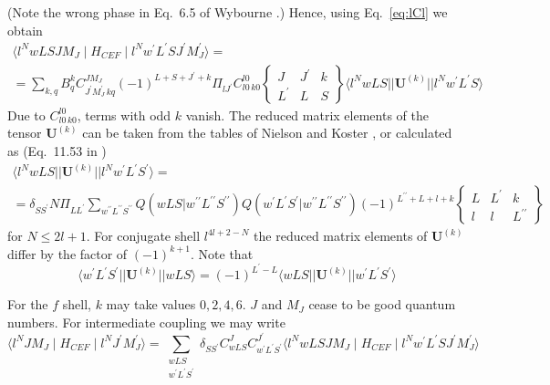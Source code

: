 \documentclass[a4paper,oneside,12pt]{extarticle}
\def \dprime {\prime\prime}
\begin{document}
%
(Note the wrong phase in Eq.~6.5 of Wybourne \cite{Wybourne}.) Hence, using Eq.~\ref{eq:lCl} we obtain
%
\begin{multline}
\langle l^N wLSJM_J \mid H_{CEF} \mid l^N w^{\prime}L^{\prime}SJ^{\prime}M_J^{\prime} \rangle = \\ =
\sum_{k,q} B_q^k C_{J^{\prime} M_J^{\prime} \, k q}^{J M_J}
(-1)^{L + S + J^{\prime}+k} \Pi_{l J^{\prime}}
C_{l 0 \, k 0}^{l 0}
\left \{
\begin{array}{ccc}
J & J^{\prime} & k \\
L^{\prime} & L & S
\end{array}
\right \} 
\langle l^N wLS || \mathbf{U}^{(k)} || l^N w^{\prime}L^{\prime}S \rangle
\end{multline}
%
Due to $C_{l 0 \, k 0}^{l 0}$, terms with odd $k$ vanish. The reduced matrix elements of the tensor $\mathbf{U}^{(k)}$ can be taken from the tables of Nielson and Koster \cite{NielsonKoster}, or calculated as (Eq.~11.53 in \cite{Cowan})
%
\begin{multline}
\langle l^N wLS || \mathbf{U}^{(k)} || l^N w^{\prime}L^{\prime}S^{\prime} \rangle = \\ =
\delta_{SS^{\prime}} N \Pi_{LL^{\prime}} \sum_{w^{\dprime}L^{\dprime}S^{\dprime}} Q(wLS|w^{\dprime}L^{\dprime}S^{\dprime})
Q(w^{\prime}L^{\prime}S^{\prime}|w^{\dprime}L^{\dprime}S^{\dprime})
(-1)^{L^{\dprime}+L+l+k}
\left \{
\begin{array}{ccc}
L & L^{\prime} & k \\
l & l & L^{\dprime}
\end{array}
\right \}
\end{multline}
%
for $N\leq 2l+1$. For conjugate shell $l^{4l+2-N}$ the reduced matrix elements of $\mathbf{U}^{(k)}$ differ by the factor of $(-1)^{k+1}$. Note that
$$
\langle w^{\prime}L^{\prime}S^{\prime} || \mathbf{U}^{(k)} || wLS \rangle =
(-1)^{L^{\prime}-L} \langle wLS || \mathbf{U}^{(k)} || w^{\prime}L^{\prime}S^{\prime} \rangle
$$

For the $f$ shell, $k$ may take values $0,2,4,6$. $J$ and $M_J$ cease to be good quantum numbers. 
For intermediate coupling we may write
%
\begin{equation}
\langle l^N JM_J \mid H_{CEF} \mid l^N J^{\prime}M_J^{\prime} \rangle = 
\sum_{\substack{wLS\\w^{\prime}L^{\prime} S^{\prime}}}
\delta_{SS^{\prime}}
C^J_{wLS} C^{J^{\prime}}_{w^{\prime}L^{\prime} S^{\prime}}
\langle l^N wLSJM_J \mid H_{CEF} \mid l^N w^{\prime}L^{\prime}SJ^{\prime}M_J^{\prime} \rangle
\end{equation}
\end{document}
